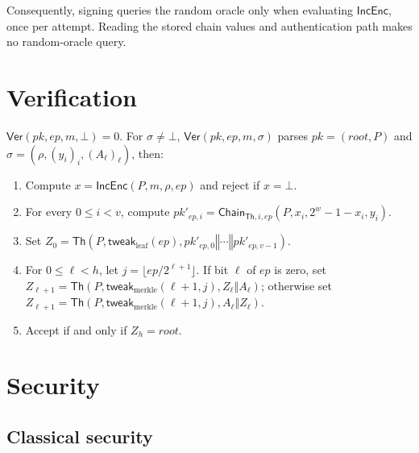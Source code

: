 \documentclass[11pt]{article}
\theoremstyle{definition}
\theoremstyle{plain}
\theoremstyle{remark}
\newcommand{\Th}{\mathsf{Th}}
\newcommand{\IncEnc}{\mathsf{IncEnc}}
\newcommand{\Ver}{\mathsf{Ver}}
\newcommand{\Chain}{\mathsf{Chain}}
\newcommand{\concat}{\mathbin\Vert}
\newcommand{\ep}{\mathit{ep}}
\newcommand{\pk}{\mathit{pk}}
\newcommand{\rootnode}{\mathit{root}}
\begin{document}
Consequently, signing queries the random oracle only when evaluating $\IncEnc$, once per attempt. Reading the stored chain values and authentication path makes no random-oracle query.

\section{Verification}

$\Ver(\pk,\ep,m,\bot)=0$. For $\sigma\neq\bot$, $\Ver(\pk,\ep,m,\sigma)$ parses $\pk=(\rootnode,P)$ and $\sigma=(\rho,(y_i)_i,(A_\ell)_\ell)$, then:
\begin{enumerate}[leftmargin=2em]
\item Compute $x=\IncEnc(P,m,\rho,\ep)$ and reject if $x=\bot$.
\item For every $0\leq i<v$, compute $\mathit{pk}'_{\ep,i}=\Chain_{\Th,i,\ep}(P,x_i,2^w-1-x_i,y_i)$.
\item Set $Z_0=\Th(P,\mathsf{tweak}_{\mathrm{leaf}}(\ep),\mathit{pk}'_{\ep,0}\concat\cdots\concat\mathit{pk}'_{\ep,v-1})$.
\item For $0\leq\ell<h$, let $j=\lfloor\ep/2^{\ell+1}\rfloor$. If bit $\ell$ of $\ep$ is zero, set $Z_{\ell+1}=\Th(P,\mathsf{tweak}_{\mathrm{merkle}}(\ell+1,j),Z_\ell\concat A_\ell)$; otherwise set $Z_{\ell+1}=\Th(P,\mathsf{tweak}_{\mathrm{merkle}}(\ell+1,j),A_\ell\concat Z_\ell)$.
\item Accept if and only if $Z_h=\rootnode$.
\end{enumerate}

\section{Security}
\label{sec:security}

\subsection{Classical security}
\end{document}
